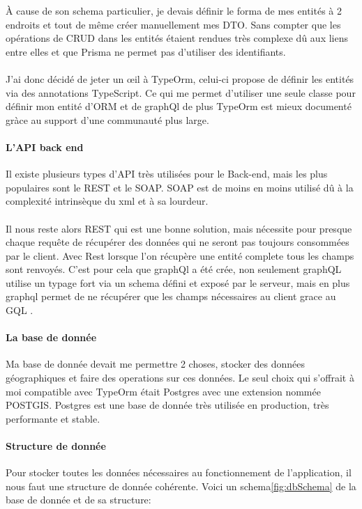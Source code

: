 À cause de son schema particulier, je devais définir le forma de mes entités à 2 endroits et tout de même créer manuellement mes DTO\@.
Sans compter que les opérations de CRUD dans les entités étaient rendues très complexe dû aux liens entre elles et que Prisma ne permet pas d'utiliser des identifiants.\\\\
J'ai donc décidé de jeter un œil à TypeOrm, celui-ci propose de définir les entités via des annotations TypeScript.
Ce qui me permet d'utiliser une seule classe pour définir mon entité d'ORM et de graphQl de plus TypeOrm est mieux
documenté gràce au support d'une communauté plus large.

\paragraph{L'API back end}
Il existe plusieurs types d'API très utilisées pour le Back-end, mais les plus populaires sont le REST et le SOAP\@.
SOAP est de moins en moins utilisé dû à la complexité intrinsèque du xml et à sa lourdeur.\\\\
Il nous reste alors REST qui est une bonne solution, mais nécessite pour presque chaque requête de récupérer des données qui ne seront pas toujours consommées par le client.
Avec Rest lorsque l'on récupère une entité complete tous les champs sont renvoyés.
C'est pour cela que graphQl a été crée, non seulement graphQL utilise un typage fort via un schema défini et exposé par le serveur,
mais en plus graphql permet de ne récupérer que les champs nécessaires au client grace au GQL .

\paragraph{La base de donnée}
Ma base de donnée devait me permettre 2 choses, stocker des données géographiques et faire des operations sur ces données.
Le seul choix qui s'offrait à moi compatible avec TypeOrm était Postgres avec une extension nommée POSTGIS\@.
Postgres est une base de donnée très utilisée en production, très performante et stable.

\paragraph{Structure de donnée}
Pour stocker toutes les données nécessaires au fonctionnement de l'application, il nous faut une structure de donnée cohérente.
Voici un schema\ref{fig:dbSchema} de la base de donnée et de sa structure:
\newpage

